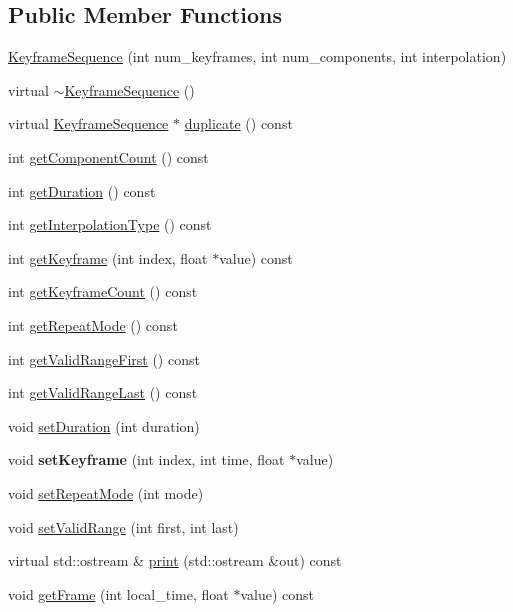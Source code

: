 \subsection*{Public Member Functions}
\begin{CompactItemize}
\item 
\hyperlink{classm3g_1_1KeyframeSequence_f48cc8113ad7300d72840b18529aaf0e}{KeyframeSequence} (int num\_\-keyframes, int num\_\-components, int interpolation)
\item 
virtual \hyperlink{classm3g_1_1KeyframeSequence_464f5929e3302c788ca626c11ca8d656}{$\sim$KeyframeSequence} ()
\item 
virtual \hyperlink{classm3g_1_1KeyframeSequence}{KeyframeSequence} $\ast$ \hyperlink{classm3g_1_1KeyframeSequence_f925b7c3107b6cdba08dbb045b203b4f}{duplicate} () const 
\item 
int \hyperlink{classm3g_1_1KeyframeSequence_7016f51d2788e78fdd736efd040f5e5e}{getComponentCount} () const 
\item 
int \hyperlink{classm3g_1_1KeyframeSequence_995a5ca5c8c3c993ef167f67cbb5fabe}{getDuration} () const 
\item 
int \hyperlink{classm3g_1_1KeyframeSequence_0d46321e7f46e037508cce88cdf6a487}{getInterpolationType} () const 
\item 
int \hyperlink{classm3g_1_1KeyframeSequence_0fd27047149eedab8b10319768e1fe9a}{getKeyframe} (int index, float $\ast$value) const 
\item 
int \hyperlink{classm3g_1_1KeyframeSequence_4d500a603f25adafd8e6f8b68872dbff}{getKeyframeCount} () const 
\item 
int \hyperlink{classm3g_1_1KeyframeSequence_a356af60b9759d5d3da833773e3c7b73}{getRepeatMode} () const 
\item 
int \hyperlink{classm3g_1_1KeyframeSequence_b7e54386674cefdb8f5fa65ce5435b50}{getValidRangeFirst} () const 
\item 
int \hyperlink{classm3g_1_1KeyframeSequence_aa98cc8d698c482c33a3487c33db27d0}{getValidRangeLast} () const 
\item 
void \hyperlink{classm3g_1_1KeyframeSequence_d7406d5e0e2f398e05e3563d099dfdf1}{setDuration} (int duration)
\item 
\hypertarget{classm3g_1_1KeyframeSequence_700d02a4ac28514016721e4b1d2bcf96}{
void \textbf{setKeyframe} (int index, int time, float $\ast$value)}
\label{classm3g_1_1KeyframeSequence_700d02a4ac28514016721e4b1d2bcf96}

\item 
void \hyperlink{classm3g_1_1KeyframeSequence_e5cd1486fe0a8a61cf96816e976d7f87}{setRepeatMode} (int mode)
\item 
void \hyperlink{classm3g_1_1KeyframeSequence_b5a824131cef547816366141afe0339a}{setValidRange} (int first, int last)
\item 
virtual std::ostream \& \hyperlink{classm3g_1_1KeyframeSequence_6fea17fa1532df3794f8cb39cb4f911f}{print} (std::ostream \&out) const 
\item 
void \hyperlink{classm3g_1_1KeyframeSequence_e172563df4ce29c6fa9bca679e9bba7c}{getFrame} (int local\_\-time, float $\ast$value) const 
\end{CompactItemize}
